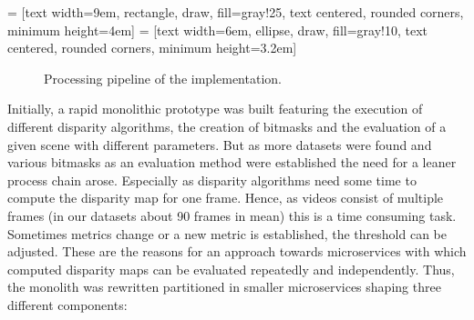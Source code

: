  = [text width=9em, rectangle, draw, fill=gray!25, text centered, rounded corners, minimum height=4em]
 = [text width=6em, ellipse, draw, fill=gray!10, text centered, rounded corners, minimum height=3.2em]
\begin{figure}[h!]
  \centering
  \caption{Processing pipeline of the implementation.}
  \label{fig:impl-pipeline}
\end{figure}

Initially, a rapid monolithic prototype was built featuring the execution of different disparity algorithms, the creation of bitmasks and the evaluation of a given scene with different parameters.
But as more datasets were found and various bitmasks as an evaluation method were established the need for a leaner process chain arose.
Especially as disparity algorithms need some time to compute the disparity map for one frame.
Hence, as videos consist of multiple frames (in our datasets about 90 frames in mean) this is a time consuming task.
Sometimes metrics change or a new metric is established, the threshold can be adjusted.
These are the reasons for an approach towards microservices with which computed disparity maps can be evaluated repeatedly and independently.
Thus, the monolith was rewritten partitioned in smaller microservices shaping three different components:

